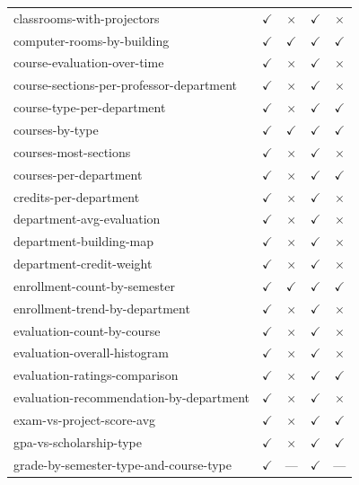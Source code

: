 \begin{longtable}{lcccc}
classrooms-with-projectors & $\checkmark$ & $\times$ & $\checkmark$ & $\times$ \\
computer-rooms-by-building & $\checkmark$ & $\checkmark$ & $\checkmark$ & $\checkmark$ \\
course-evaluation-over-time & $\checkmark$ & $\times$ & $\checkmark$ & $\times$ \\
course-sections-per-professor-department & $\checkmark$ & $\times$ & $\checkmark$ & $\times$ \\
course-type-per-department & $\checkmark$ & $\times$ & $\checkmark$ & $\checkmark$ \\
courses-by-type & $\checkmark$ & $\checkmark$ & $\checkmark$ & $\checkmark$ \\
courses-most-sections & $\checkmark$ & $\times$ & $\checkmark$ & $\times$ \\
courses-per-department & $\checkmark$ & $\times$ & $\checkmark$ & $\checkmark$ \\
credits-per-department & $\checkmark$ & $\times$ & $\checkmark$ & $\times$ \\
department-avg-evaluation & $\checkmark$ & $\times$ & $\checkmark$ & $\times$ \\
department-building-map & $\checkmark$ & $\times$ & $\checkmark$ & $\times$ \\
department-credit-weight & $\checkmark$ & $\times$ & $\checkmark$ & $\times$ \\
enrollment-count-by-semester & $\checkmark$ & $\checkmark$ & $\checkmark$ & $\checkmark$ \\
enrollment-trend-by-department & $\checkmark$ & $\times$ & $\checkmark$ & $\times$ \\
evaluation-count-by-course & $\checkmark$ & $\times$ & $\checkmark$ & $\times$ \\
evaluation-overall-histogram & $\checkmark$ & $\times$ & $\checkmark$ & $\times$ \\
evaluation-ratings-comparison & $\checkmark$ & $\times$ & $\checkmark$ & $\checkmark$ \\
evaluation-recommendation-by-department & $\checkmark$ & $\times$ & $\checkmark$ & $\times$ \\
exam-vs-project-score-avg & $\checkmark$ & $\times$ & $\checkmark$ & $\checkmark$ \\
gpa-vs-scholarship-type & $\checkmark$ & $\times$ & $\checkmark$ & $\checkmark$ \\
grade-by-semester-type-and-course-type & $\checkmark$ & --- & $\checkmark$ & --- \\

\end{longtable}
